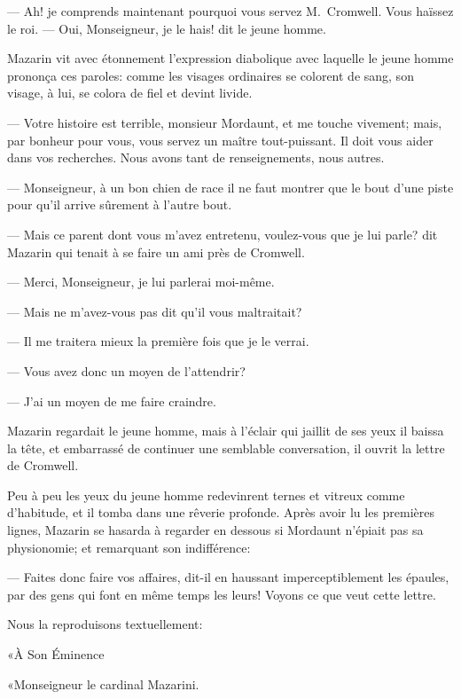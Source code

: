 — Ah! je comprends maintenant pourquoi vous servez M.~Cromwell. Vous haïssez le roi.
— Oui, Monseigneur, je le hais! dit le jeune homme.

Mazarin vit avec étonnement l'expression diabolique avec laquelle le jeune homme prononça ces paroles: comme les visages ordinaires se colorent de sang, son visage, à lui, se colora de fiel et devint livide.

— Votre histoire est terrible, monsieur Mordaunt, et me touche vivement; mais, par bonheur pour vous, vous servez un maître tout-puissant. Il doit vous aider dans vos recherches. Nous avons tant de renseignements, nous autres.

— Monseigneur, à un bon chien de race il ne faut montrer que le bout d'une piste pour qu'il arrive sûrement à l'autre bout.

— Mais ce parent dont vous m'avez entretenu, voulez-vous que je lui parle? dit Mazarin qui tenait à se faire un ami près de Cromwell.

— Merci, Monseigneur, je lui parlerai moi-même.

— Mais ne m'avez-vous pas dit qu'il vous maltraitait?

— Il me traitera mieux la première fois que je le verrai.

— Vous avez donc un moyen de l'attendrir?

— J'ai un moyen de me faire craindre.

Mazarin regardait le jeune homme, mais à l'éclair qui jaillit de ses yeux il baissa la tête, et embarrassé de continuer une semblable conversation, il ouvrit la lettre de Cromwell.

Peu à peu les yeux du jeune homme redevinrent ternes et vitreux comme d'habitude, et il tomba dans une rêverie profonde. Après avoir lu les premières lignes, Mazarin se hasarda à regarder en dessous si Mordaunt n'épiait pas sa physionomie; et remarquant son indifférence:

— Faites donc faire vos affaires, dit-il en haussant imperceptiblement les épaules, par des gens qui font en même temps les leurs! Voyons ce que veut cette lettre.

Nous la reproduisons textuellement:

«À Son Éminence

«Monseigneur le cardinal Mazarini.

